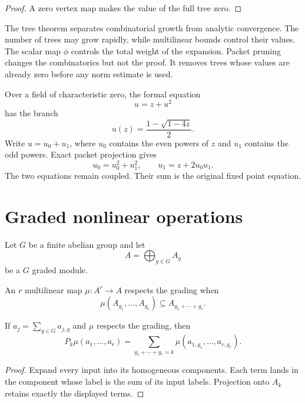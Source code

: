 \begin{proof}
A zero vertex map makes the value of the full tree zero.
\end{proof}


The tree theorem separates combinatorial growth from analytic convergence.  The number of trees may grow rapidly, while multilinear bounds control their values. The scalar map $\phi$ controls the total weight of the expansion.  Packet pruning changes the combinatorics but not the proof.  It removes trees whose values are already zero before any norm estimate is used.

\begin{example}\label{ex:catalan_parity}
Over a field of characteristic zero, the formal equation
\[
u=z+u^2
\]
has the branch
\[
u(z)=\frac{1-\sqrt{1-4z}}2.
\]
Write $u=u_0+u_1$, where $u_0$ contains the even powers of $z$ and $u_1$ contains the odd powers.  Exact packet projection gives
\[
u_0=u_0^2+u_1^2,
\qquad
u_1=z+2u_0u_1.
\]
The two equations remain coupled.  Their sum is the original fixed point equation.
\end{example}

\section{Graded nonlinear operations}\label{sec:graded_operations}

Let $G$ be a finite abelian group and let
\[
A=\bigoplus_{g\in G}A_g
\]
be a $G$ graded module.

\begin{definition}\label{def:grade_respecting}
An $r$ multilinear map $\mu:A^r\to A$ respects the grading when
\[
\mu(A_{g_1},\ldots,A_{g_r})
\subseteq
A_{g_1+\cdots+g_r}.
\]
\end{definition}

\begin{theorem}\label{thm:graded_convolution}
If $a_j=\sum_{g\in G}a_{j,g}$ and $\mu$ respects the grading, then
\[
P_k\mu(a_1,\ldots,a_r)
=
\sum_{g_1+\cdots+g_r=k}
\mu(a_{1,g_1},\ldots,a_{r,g_r}).
\]
\end{theorem}

\begin{proof}
Expand every input into its homogeneous components.  Each term lands in the component whose label is the sum of its input labels.  Projection onto $A_k$ retains exactly the displayed terms.
\end{proof}

